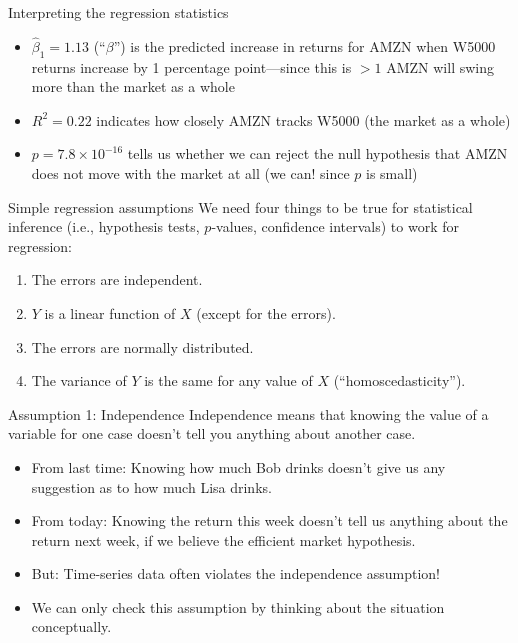 \documentclass{beamer}\usepackage[]{graphicx}\usepackage[]{color}
\begin{document}
\begin{darkframes}
    \begin{frame}{Interpreting the regression statistics}
      \begin{itemize}[<+->]
        \item $\hat\beta_1=1.13$ (``$\beta$'') is the predicted increase in returns for AMZN when W5000 returns increase by 1 percentage point---since this is $>1$ AMZN will swing more than the market as a whole
        \item $R^2=0.22$ indicates how closely AMZN tracks W5000 (the market as a whole)
        \item $p=\ensuremath{7.8\times 10^{-16}}$ tells us whether we can reject the null hypothesis that AMZN does not move with the market at all \pause (we can! since $p$ is small)
      \end{itemize}
    \end{frame}

    \begin{frame}{Simple regression assumptions}
      We need four things to be true for statistical inference (i.e., hypothesis tests, $p$-values, confidence intervals) to work for regression:
      \pause
      \begin{enumerate}
        \item The errors are independent.
        \item $Y$ is a linear function of $X$ (except for the errors).
        \item The errors are normally distributed.
        \item The variance of $Y$ is the same for any value of $X$ (``homoscedasticity'').
      \end{enumerate}
    \end{frame}

    \begin{frame}{Assumption 1: Independence}
      Independence means that knowing the value of a variable for one case doesn't tell you anything about another case.

      \begin{itemize}[<+->]
        \item From last time: Knowing how much Bob drinks doesn't give us any suggestion as to how much Lisa drinks.
        \item From today: Knowing the return this week doesn't tell us anything about the return next week, if we believe the efficient market hypothesis.
        \item \alert{But:} Time-series data often violates the independence assumption!
        \item We can only check this assumption by thinking about the situation conceptually.
      \end{itemize}
    \end{frame}


\end{darkframes}
\end{document}
